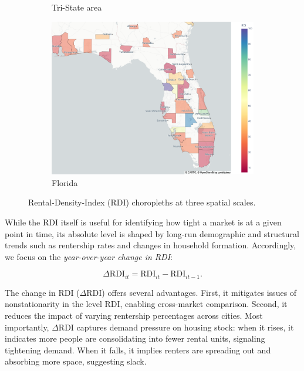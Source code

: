 \documentclass[APA,Times1COL]{WileyNJDv5} %
\begin{document}
\begin{figure}[hbt!]
\begin{subfigure}[b]{0.32\textwidth}
		\caption{Tri-State area}\label{fig:tristate_choropleth}
	\end{subfigure}\hfill
	\begin{subfigure}[b]{0.32\textwidth}
		\includegraphics[width=\linewidth]{florida.png}
		\caption{Florida}\label{fig:florida_choropleth}
	\end{subfigure}
	
	\caption{Rental-Density-Index (RDI) choropleths at three spatial scales.}
	\label{fig:choropleth_panel}
\end{figure}


While the RDI itself is useful for identifying how tight a market is at a given point in time, its absolute level is shaped by long-run demographic and structural trends such as rentership rates and changes in household formation. Accordingly, we focus on the \textit{year-over-year change in RDI}:

\begin{equation*}
	\Delta \text{RDI}_{it} = \text{RDI}_{it} - \text{RDI}_{it-1}.
\end{equation*}


The change in RDI (\( \Delta \text{RDI} \)) offers several advantages. First, it mitigates issues of nonstationarity in the level RDI, enabling cross-market comparison. Second, it reduces the impact of varying rentership percentages across cities. Most importantly, \( \Delta \text{RDI} \) captures demand pressure on housing stock: when it rises, it indicates more people are consolidating into fewer rental units, signaling tightening demand. When it falls, it implies renters are spreading out and absorbing more space, suggesting slack.
\end{document}
